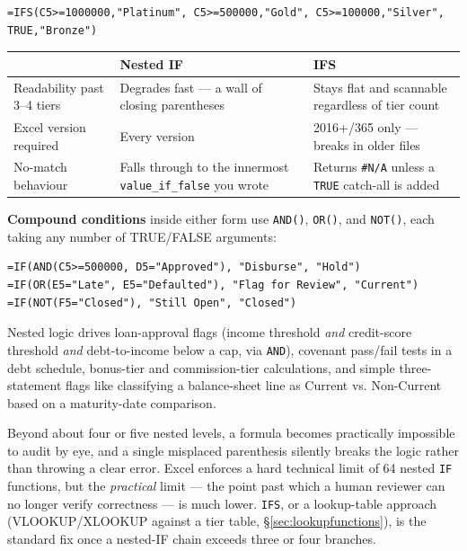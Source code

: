 \documentclass[11pt,a4paper]{article}
\begin{document}
\begin{lstlisting}[style=excelstyle, caption={The same bonus schedule, IFS style}]
=IFS(C5>=1000000,"Platinum", C5>=500000,"Gold", C5>=100000,"Silver", TRUE,"Bronze")
\end{lstlisting}

\begin{center}
\begin{tabular}{@{}L{3.4cm}L{4.4cm}L{4.6cm}@{}}
\toprule
\textbf{} & \textbf{Nested IF} & \textbf{IFS} \\
\midrule
Readability past 3--4 tiers & Degrades fast --- a wall of closing parentheses & Stays flat and scannable regardless of tier count \\
Excel version required & Every version & 2016+/365 only --- breaks in older files \\
No-match behaviour & Falls through to the innermost \texttt{value\_if\_false} you wrote & Returns \texttt{\#N/A} unless a \texttt{TRUE} catch-all is added \\
\bottomrule
\end{tabular}
\end{center}

\textbf{Compound conditions} inside either form use \texttt{AND()}, \texttt{OR()}, and \texttt{NOT()}, each taking any number of TRUE/FALSE arguments:

\begin{lstlisting}[style=excelstyle, caption={Compound logical tests}]
=IF(AND(C5>=500000, D5="Approved"), "Disburse", "Hold")
=IF(OR(E5="Late", E5="Defaulted"), "Flag for Review", "Current")
=IF(NOT(F5="Closed"), "Still Open", "Closed")
\end{lstlisting}

\begin{financeapp}
Nested logic drives loan-approval flags (income threshold \emph{and} credit-score threshold \emph{and} debt-to-income below a cap, via \texttt{AND}), covenant pass/fail tests in a debt schedule, bonus-tier and commission-tier calculations, and simple three-statement flags like classifying a balance-sheet line as Current vs. Non-Current based on a maturity-date comparison.
\end{financeapp}

\begin{pitfall}
Beyond about four or five nested levels, a formula becomes practically impossible to audit by eye, and a single misplaced parenthesis silently breaks the logic rather than throwing a clear error. Excel enforces a hard technical limit of 64 nested \texttt{IF} functions, but the \emph{practical} limit --- the point past which a human reviewer can no longer verify correctness --- is much lower. \texttt{IFS}, or a lookup-table approach (VLOOKUP/XLOOKUP against a tier table, \S\ref{sec:lookupfunctions}), is the standard fix once a nested-IF chain exceeds three or four branches.
\end{pitfall}
\end{document}

